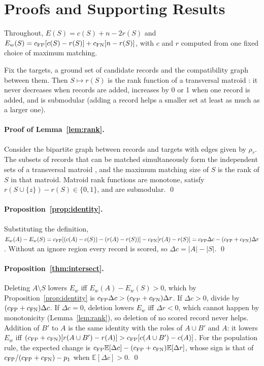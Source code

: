 \section{Proofs and Supporting Results}\label{app:proofs}

Throughout, $E(S)=c(S)+n-2r(S)$ and $E_w(S)=c_{\mathrm{FP}}[c(S)-r(S)]+c_{\mathrm{FN}}[n-r(S)]$, with $c$ and $r$ computed from one fixed choice of maximum matching.

\begin{lemma}\label{lem:rank}
Fix the targets, a ground set of candidate records and the compatibility graph between them. Then $S\mapsto r(S)$ is the rank function of a transversal matroid \citep{edmonds1965transversals}: it never decreases when records are added, increases by 0 or 1 when one record is added, and is submodular (adding a record helps a smaller set at least as much as a larger one).
\end{lemma}

\paragraph{Proof of Lemma~\ref{lem:rank}.} Consider the bipartite graph between records and targets with edges given by $\rho_\tau$. The subsets of records that can be matched simultaneously form the independent sets of a transversal matroid \citep{edmonds1965transversals}, and the maximum matching size of $S$ is the rank of $S$ in that matroid. Matroid rank functions are monotone, satisfy $r(S\cup\{z\})-r(S)\in\{0,1\}$, and are submodular. \qed

\paragraph{Proposition~\ref{prop:identity}.} Substituting the definition, $E_w(A)-E_w(S)=c_{\mathrm{FP}}[(c(A)-c(S))-(r(A)-r(S))]-c_{\mathrm{FN}}[r(A)-r(S)]=c_{\mathrm{FP}}\Delta c-(c_{\mathrm{FP}}+c_{\mathrm{FN}})\Delta r$. Without an ignore region every record is scored, so $\Delta c=|A|-|S|$. \qed

\paragraph{Proposition~\ref{thm:intersect}.} Deleting $A\setminus S$ lowers $E_w$ iff $E_w(A)-E_w(S)>0$, which by Proposition~\ref{prop:identity} is $c_{\mathrm{FP}}\Delta c>(c_{\mathrm{FP}}+c_{\mathrm{FN}})\Delta r$. If $\Delta c>0$, divide by $(c_{\mathrm{FP}}+c_{\mathrm{FN}})\Delta c$. If $\Delta c=0$, deletion lowers $E_w$ iff $\Delta r<0$, which cannot happen by monotonicity (Lemma~\ref{lem:rank}), so deletion of no scored record never helps. Addition of $B'$ to $A$ is the same identity with the roles of $A\cup B'$ and $A$: it lowers $E_w$ iff $(c_{\mathrm{FP}}+c_{\mathrm{FN}})[r(A\cup B')-r(A)]>c_{\mathrm{FP}}[c(A\cup B')-c(A)]$. For the population rule, the expected change is $c_{\mathrm{FP}}\mathbb{E}[\Delta c]-(c_{\mathrm{FP}}+c_{\mathrm{FN}})\mathbb{E}[\Delta r]$, whose sign is that of $c_{\mathrm{FP}}/(c_{\mathrm{FP}}+c_{\mathrm{FN}})-p_1$ when $\mathbb{E}[\Delta c]>0$. \qed

